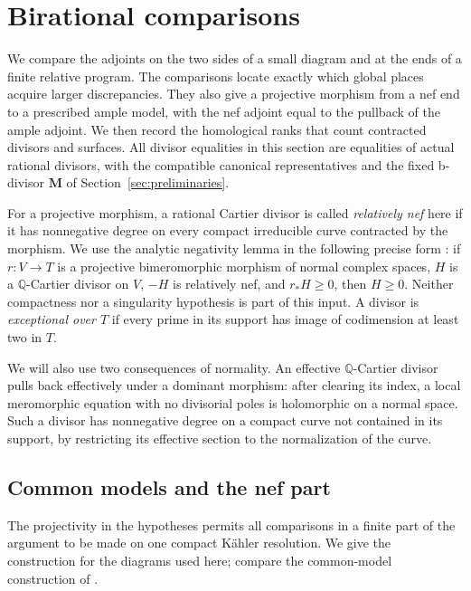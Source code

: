 \documentclass[11pt]{amsart}
\theoremstyle{definition}
\theoremstyle{remark}
\numberwithin{equation}{section}
\newcommand{\Q}{\mathbb{Q}}
\newcommand{\M}{\mathbf{M}}
\begin{document}
\section{Birational comparisons}
\label{sec:comparisons}

We compare the adjoints on the two sides of a small diagram and at the
ends of a finite relative program.  The comparisons locate exactly which
global places acquire larger discrepancies.  They also give a projective
morphism from a nef end to a prescribed ample model, with the nef adjoint
equal to the pullback of the ample adjoint.  We then record the homological
ranks that count contracted divisors and surfaces.
All divisor equalities in this section are equalities of actual rational
divisors, with the compatible canonical representatives and the fixed
b-divisor $\M$ of Section~\ref{sec:preliminaries}.

For a projective morphism, a rational Cartier divisor is called
\emph{relatively nef} here if it has nonnegative degree on every compact
irreducible curve contracted by the morphism.  We use the analytic
negativity lemma in the following precise form
\cite[Lemma~2.2]{CanonicalKahler}: if $r:V\to T$ is a projective
bimeromorphic morphism of normal complex spaces, $H$ is a
$\Q$-Cartier divisor on $V$, $-H$ is relatively nef, and $r_*H\geq0$,
then $H\geq0$.  Neither compactness nor a singularity hypothesis is
part of this input.  A divisor is \emph{exceptional over $T$} if every
prime in its support has image of codimension at least two in $T$.

We will also use two consequences of normality.  An effective
$\Q$-Cartier divisor pulls back effectively under a dominant morphism:
after clearing its index, a local meromorphic equation with no
divisorial poles is holomorphic on a normal space.  Such a divisor has
nonnegative degree on a compact curve not contained in its support,
by restricting its effective section to the normalization of the curve.

\subsection{Common models and the nef part}

The projectivity in the hypotheses permits all comparisons in a finite
part of the argument to be made on one compact K\"ahler resolution.
We give the construction for the diagrams used here; compare the
common-model construction of \cite[Proposition~2.1]{CanonicalKahler}.
\end{document}
